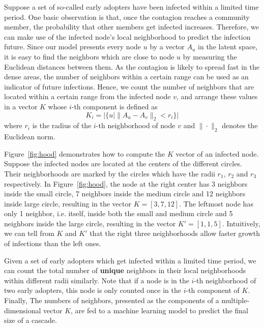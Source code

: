 Suppose a set of so-called early adopters have been infected within a limited time period. One basic observation is that, once the contagion reaches a community member, the probability that other members get infected increases. Therefore, we can make use of the infected node's local neighborhood to predict the infection future. Since our model presents every node $u$ by a vector $A_u$ in the latent space, it is easy to find the neighbors which are close to node $u$ by measuring the Euclidean distances between them. As the contagion is likely to spread fast in the dense areas, the number of neighbors within a certain range can be used as an indicator of future infections. Hence, we count the number of neighbors that are located within a certain range from the infected node $v$, and arrange these values in a vector $K$ whose $i$-th component is defined as
\begin{equation} \label{eq:prediction_}
K_i = |\{u|\|A_u - A_v\|_2 < r_i\}|
\end{equation}
where $r_i$ is the radius of the $i$-th neighborhood of node $v$ and $\|\cdot \|_2$ denotes the Euclidean norm.

Figure~\ref{fig:hood} demonstrates how to compute the $K$ vector of an infected node. Suppose the infected nodes are located at the centers of the different circles. Their neighborhoods are marked by the circles which have the radii $r_1$, $r_2$ and $r_3$ respectively. In Figure~\ref{fig:hood}, the node at the right center has 3 neighbors inside the small circle, 7 neighbors inside the medium circle and 12 neighbors inside large circle, resulting in the vector $K=[3,7,12]$. The leftmost node has only 1 neighbor, i.e. itself, inside both the small and medium circle and 5 neighbors inside the large circle, resulting in the vector $K'=[1,1,5]$. Intuitively, we can tell from $K$ and $K'$ that the right three neighborhoods allow faster growth of infections than the left ones. 

Given a set of early adopters which get infected within a limited time period, we can count the total number of \textbf{unique} neighbors in their local neighborhoods within different radii similarly. Note that if a node is in the $i$-th neighborhood of two early adopters, this node is only counted once in the $i$-th component of $K$. Finally, The numbers of neighbors, presented as the components of a multiple-dimensional vector $K$, are fed to a machine learning model to predict the final size of a cascade.

